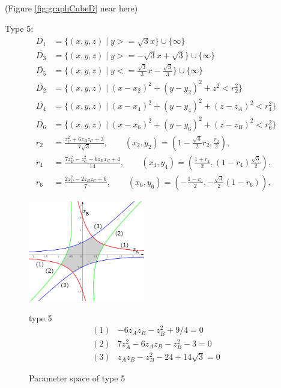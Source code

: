 \documentclass[suppldata, dvipdfmx]{interact}
\theoremstyle{plain}%
\theoremstyle{definition}
\theoremstyle{remark}
\theoremstyle{problemstyle}
\begin{document}
\noindent(Figure \ref{fig:graphCubeD} near here)
\bigskip\par
Type 5:
\begin{align*}
\overline{D_1}&=\{ (x,y,z) \mid y >= \sqrt{3}x \} \cup \{ \infty \}\\
\overline{D_3}&=\{(x,y,z) \mid y >= -\sqrt{3}x + \sqrt{3} \} \cup\{\infty\}\\
\overline{D_5}&=\{(x,y,z) \mid y <= \frac{\sqrt{3}}{3}x - \frac{\sqrt{3}}{3} \} \cup\{\infty\}\\
\overline{D_2}&=\{(x,y,z) \mid (x-x_2)^2+(y-y_2)^2+z^2<r_2^2 \} \\
\overline{D_4}&=\{(x,y,z) \mid (x-x_4)^2+(y-y_4)^2+(z-z_A)^2<r_4^2 \} \\
\overline{D_6}&=\{(x,y,z) \mid (x-x_6)^2+(y-y_6)^2+(z-z_B)^2<r_6^2 \} \\
 r_2 &= \frac{z_C^2 + 6z_Bz_C + 3}{7\sqrt{3}}, \qquad
(x_2, y_2) = \left(1 - \frac{\sqrt{3}}{2}r_2, \frac{r_2}{2}\right),\\
 r_4 &= \frac{7z_B^2 - z_C^2 -6z_Bz_C + 4}{14}, \qquad
(x_4, y_4) = \left(\frac{1 + r_4}{2}, (1 - r_4)\frac{\sqrt{3}}{2}\right),\\
 r_6 &= \frac{2z_C^2 - 2z_Bz_C + 6}{7}, \qquad
(x_6, y_6) = \left(-\frac{1 - r_6}{2}, -\frac{\sqrt{3}}{2}(1 - r_6)\right),
\end{align*} 
\begin{figure}[h]
 \begin{minipage}[]{0.5\textwidth}
 \centering
 \includegraphics[width=2in,
 keepaspectratio]{./img/graph/cubeE.jpg}
 \caption{Parameter space of type 5}
 \label{fig:graphCubeE}
 \end{minipage}
 \hspace*{\fill}
 \begin{minipage}[]{0.5\textwidth}
  \centering
  type 5
  \begin{align*}
   (1)& -6z_Az_B - z_B^2 + 9/4 = 0\\
   (2)& 7z_A^2 - 6z_Az_B - z_B^2 - 3 = 0\\
   (3)& z_Az_B - z_B^2 - 24 + 14\sqrt{3} = 0
  \end{align*}
 \end{minipage}
 \hspace*{\fill}
\end{figure}
\end{document}
